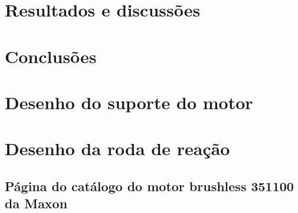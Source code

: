 \documentclass[
	12pt,				%
	openany,			%
	twoside,			%
	a4paper,			%
	english,			%
	french,				%
	spanish,			%
	brazil,				%
	oldfontcommands
	]{abntex2}
\begin{document}
%	

\chapter[Resultados e discussões]{Resultados e discussões}

\chapter[Conclusões]{Conclusões}



\begin{apendicesenv}
\partapendices
\chapter{Desenho do suporte do motor}



\chapter{Desenho da roda de reação}



\end{apendicesenv}

\begin{anexosenv}
\partanexos
\chapter{Página do catálogo do motor brushless 351100 da Maxon}



\end{anexosenv}
\end{document}
